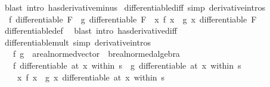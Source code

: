 \begin{isabellebody}
\ {\isacharparenleft}{\kern0pt}blast\ intro{\isacharcolon}{\kern0pt}\ has{\isacharunderscore}{\kern0pt}derivative{\isacharunderscore}{\kern0pt}minus{\isacharparenright}{\kern0pt}%
\endisatagproof
{\isafoldproof}%
%
\isadelimproof
\isanewline
%
\endisadelimproof
\isanewline
{}\isamarkupfalse%
\ differentiable{\isacharunderscore}{\kern0pt}diff\ {\isacharbrackleft}{\kern0pt}simp{\isacharcomma}{\kern0pt}\ derivative{\isacharunderscore}{\kern0pt}intros{\isacharbrackright}{\kern0pt}{\isacharcolon}{\kern0pt}\isanewline
\ \ {\isachardoublequoteopen}f\ differentiable\ F\ {\isasymLongrightarrow}\ g\ differentiable\ F\ {\isasymLongrightarrow}\ {\isacharparenleft}{\kern0pt}{\isasymlambda}x{\isachardot}{\kern0pt}\ f\ x\ {\isacharminus}{\kern0pt}\ g\ x{\isacharparenright}{\kern0pt}\ differentiable\ F{\isachardoublequoteclose}\isanewline
%
\isadelimproof
\ \ %
\endisadelimproof
%
\isatagproof
{}\isamarkupfalse%
\ differentiable{\isacharunderscore}{\kern0pt}def\ \isamarkupfalse%
\ {\isacharparenleft}{\kern0pt}blast\ intro{\isacharcolon}{\kern0pt}\ has{\isacharunderscore}{\kern0pt}derivative{\isacharunderscore}{\kern0pt}diff{\isacharparenright}{\kern0pt}%
\endisatagproof
{\isafoldproof}%
%
\isadelimproof
\isanewline
%
\endisadelimproof
\isanewline
{}\isamarkupfalse%
\ differentiable{\isacharunderscore}{\kern0pt}mult\ {\isacharbrackleft}{\kern0pt}simp{\isacharcomma}{\kern0pt}\ derivative{\isacharunderscore}{\kern0pt}intros{\isacharbrackright}{\kern0pt}{\isacharcolon}{\kern0pt}\isanewline
\ \ \ f\ g\ {\isacharcolon}{\kern0pt}{\isacharcolon}{\kern0pt}\ {\isachardoublequoteopen}{\isacharprime}{\kern0pt}a{\isacharcolon}{\kern0pt}{\isacharcolon}{\kern0pt}real{\isacharunderscore}{\kern0pt}normed{\isacharunderscore}{\kern0pt}vector\ {\isasymRightarrow}\ {\isacharprime}{\kern0pt}b{\isacharcolon}{\kern0pt}{\isacharcolon}{\kern0pt}real{\isacharunderscore}{\kern0pt}normed{\isacharunderscore}{\kern0pt}algebra{\isachardoublequoteclose}\isanewline
\ \ \ {\isachardoublequoteopen}f\ differentiable\ {\isacharparenleft}{\kern0pt}at\ x\ within\ s{\isacharparenright}{\kern0pt}\ {\isasymLongrightarrow}\ g\ differentiable\ {\isacharparenleft}{\kern0pt}at\ x\ within\ s{\isacharparenright}{\kern0pt}\ {\isasymLongrightarrow}\isanewline
\ \ \ \ {\isacharparenleft}{\kern0pt}{\isasymlambda}x{\isachardot}{\kern0pt}\ f\ x\ {\isacharasterisk}{\kern0pt}\ g\ x{\isacharparenright}{\kern0pt}\ differentiable\ {\isacharparenleft}{\kern0pt}at\ x\ within\ s{\isacharparenright}{\kern0pt}{\isachardoublequoteclose}\isanewline

\end{isabellebody}
